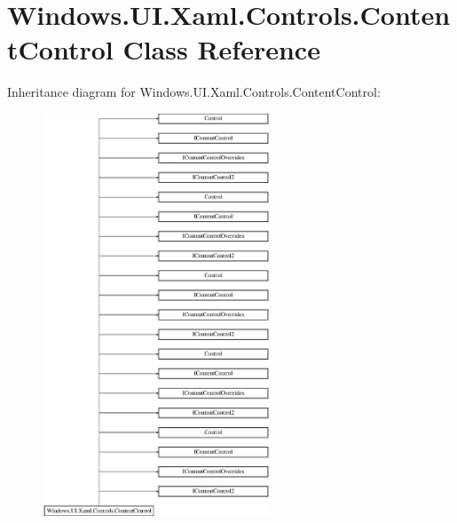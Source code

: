 \hypertarget{class_windows_1_1_u_i_1_1_xaml_1_1_controls_1_1_content_control}{}\section{Windows.\+U\+I.\+Xaml.\+Controls.\+Content\+Control Class Reference}
\label{class_windows_1_1_u_i_1_1_xaml_1_1_controls_1_1_content_control}
Inheritance diagram for Windows.\+U\+I.\+Xaml.\+Controls.\+Content\+Control\+:\begin{figure}[H]
\begin{center}
\leavevmode
\includegraphics[height=12.000000cm]{class_windows_1_1_u_i_1_1_xaml_1_1_controls_1_1_content_control}
\end{center}
\end{figure}
